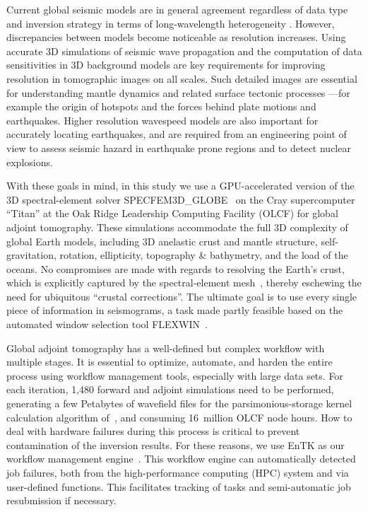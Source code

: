 \documentclass[extra,mreferee]{gji}
\begin{document}
Current global seismic models are in general agreement regardless of data type and inversion strategy in terms of long-wavelength heterogeneity \citep{ritzwollerlavely1995,TW01,beckerboschi2002}.
However, discrepancies between models become noticeable as resolution increases.
Using accurate 3D simulations of seismic wave propagation and the computation of data sensitivities in 3D background models are key requirements for improving resolution in tomographic images on all scales.
Such detailed images are essential for understanding mantle dynamics and related surface tectonic processes
---for example the origin of hotspots and the forces behind plate motions and earthquakes.
Higher resolution wavespeed models are also important for accurately locating earthquakes, and are required from an engineering point of view to assess seismic hazard in earthquake prone regions and to detect nuclear explosions. 

With these goals in mind,
in this study we use a GPU-accelerated version of the 3D spectral-element solver
SPECFEM3D\_GLOBE~\citep{KoTr02a,KoTr02b} on the Cray supercomputer ``Titan'' at the Oak Ridge Leadership Computing Facility (OLCF) for global adjoint tomography.
These simulations accommodate the full 3D complexity of global Earth models,
including 3D anelastic crust and mantle structure, self-gravitation, rotation, ellipticity, topography \& bathymetry, and the load of the oceans.
No compromises are made with regards to resolving the Earth's crust,
which is explicitly captured by the spectral-element mesh~\citep{tromp2010a},
thereby eschewing the need for ubiquitous ``crustal corrections''.
The ultimate goal is to use every single piece of information in seismograms,
a task made partly feasible based on the automated window selection tool FLEXWIN~\citep{maggi2009automated}.

Global adjoint tomography has a well-defined but complex workflow with multiple stages.
It is essential to optimize, automate, and harden the entire process using workflow management tools, especially with large data sets.
For each iteration,
1,480 forward and adjoint simulations need to be performed,
generating a few Petabytes of wavefield files for the parsimonious-storage kernel calculation algorithm of~\cite{KoXiBoPeSaLiTr16}, and consuming 16~million OLCF node hours.
How to deal with hardware failures during this process is critical
to prevent contamination of the inversion results.
For these reasons, we use EnTK as our
workflow management engine~\citep{EnTK2017}.
This workflow engine can automatically detected job failures,
both from the high-performance computing (HPC) system and via user-defined functions.
This facilitates tracking of tasks and semi-automatic job resubmission if necessary.
\end{document}
